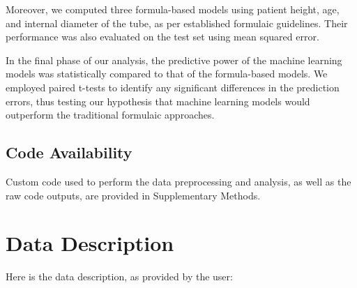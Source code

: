 \documentclass[11pt]{article}
\begin{document}
Moreover, we computed three formula-based models using patient height, age, and internal diameter of the tube, as per established formulaic guidelines. Their performance was also evaluated on the test set using mean squared error.

In the final phase of our analysis, the predictive power of the machine learning models was statistically compared to that of the formula-based models. We employed paired t-tests to identify any significant differences in the prediction errors, thus testing our hypothesis that machine learning models would outperform the traditional formulaic approaches.\subsection*{Code Availability}

Custom code used to perform the data preprocessing and analysis, as well as the raw code outputs, are provided in Supplementary Methods.






\clearpage
\appendix

\section{Data Description} \label{sec:data_description} Here is the data description, as provided by the user:
\end{document}
